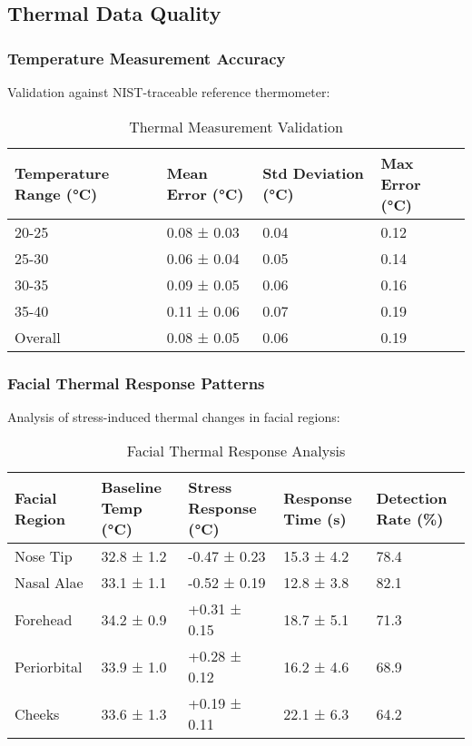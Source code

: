 \subsection{Thermal Data Quality}

\subsubsection{Temperature Measurement Accuracy}

Validation against NIST-traceable reference thermometer:

\begin{table}[htbp]
\centering
\caption{Thermal Measurement Validation}
\begin{tabular}{|l|l|l|l|}
\hline
\textbf{Temperature Range (°C)} & \textbf{Mean Error (°C)} & \textbf{Std Deviation (°C)} & \textbf{Max Error (°C)} \\
\hline
20-25 & 0.08 ± 0.03 & 0.04 & 0.12 \\
25-30 & 0.06 ± 0.04 & 0.05 & 0.14 \\
30-35 & 0.09 ± 0.05 & 0.06 & 0.16 \\
35-40 & 0.11 ± 0.06 & 0.07 & 0.19 \\
Overall & 0.08 ± 0.05 & 0.06 & 0.19 \\
\hline
\end{tabular}
\end{table}

\subsubsection{Facial Thermal Response Patterns}

Analysis of stress-induced thermal changes in facial regions:

\begin{table}[htbp]
\centering
\caption{Facial Thermal Response Analysis}
\begin{tabular}{|l|l|l|l|l|}
\hline
\textbf{Facial Region} & \textbf{Baseline Temp (°C)} & \textbf{Stress Response (°C)} & \textbf{Response Time (s)} & \textbf{Detection Rate (\%)} \\
\hline
Nose Tip & 32.8 ± 1.2 & -0.47 ± 0.23 & 15.3 ± 4.2 & 78.4 \\
Nasal Alae & 33.1 ± 1.1 & -0.52 ± 0.19 & 12.8 ± 3.8 & 82.1 \\
Forehead & 34.2 ± 0.9 & +0.31 ± 0.15 & 18.7 ± 5.1 & 71.3 \\
Periorbital & 33.9 ± 1.0 & +0.28 ± 0.12 & 16.2 ± 4.6 & 68.9 \\
Cheeks & 33.6 ± 1.3 & +0.19 ± 0.11 & 22.1 ± 6.3 & 64.2 \\
\hline
\end{tabular}
\end{table}

